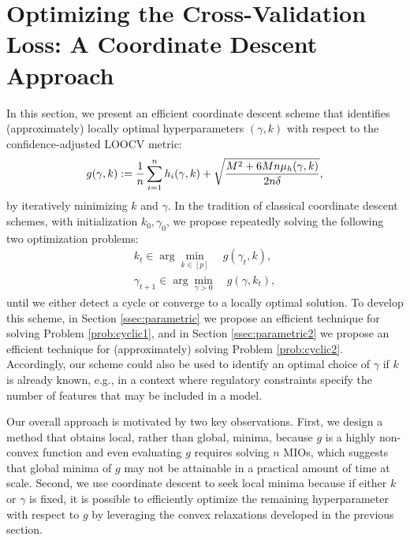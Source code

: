 \documentclass[opre,nonblindrev]{informs3} %
\begin{document}
\section{Optimizing the Cross-Validation Loss: A Coordinate Descent Approach}\label{sec:corddescent}
In this section, we present an efficient coordinate descent scheme that identifies (approximately) locally optimal hyperparameters $(\gamma, k)$ with respect to the confidence-adjusted LOOCV metric: 
\begin{equation}\label{prob:cyclic1}
	g(\gamma, k):= \frac{1}{n} \sum_{i=1}^n h_i(\gamma, k)+\sqrt{\frac{M^2+6 M n \mu_h(\gamma, k)}{2 n \delta}},\\[0.2em]
\end{equation}
by iteratively minimizing $k$ and $\gamma$. In the tradition of classical coordinate descent schemes, with initialization $k_0, \gamma_0$, we propose repeatedly solving the following two optimization problems:
\begin{align}\label{prob:cyclic2}
    k_t \in \arg\min_{k \in [p]} \quad g(\gamma_t, k),\\
    \gamma_{t+1} \in \arg \min_{\gamma >0 } \quad g(\gamma, k_t),
\end{align}
until we either detect a cycle or converge to a locally optimal solution. To develop this scheme, in Section \ref{ssec:parametric} we propose an efficient technique for solving Problem \eqref{prob:cyclic1}, %
and in Section \ref{ssec:parametric2} we propose an efficient technique for (approximately) solving Problem \eqref{prob:cyclic2}. Accordingly, our scheme could also be used to identify an optimal choice of $\gamma$ if $k$ is already known, e.g., in a context where regulatory constraints specify the number of features that may be included in a model.

Our overall approach is motivated by two key observations. First, we design a method that obtains local, rather than global, minima, because $g$ is a highly non-convex function and even evaluating $g$ requires solving $n$ MIOs, which suggests that global minima of $g$ may not be attainable in a practical amount of time at scale. Second, we use coordinate descent to seek local minima because if either $k$ or $\gamma$ is fixed, it is possible to efficiently optimize the remaining hyperparameter with respect to $g$ by leveraging the convex relaxations developed in the previous section. %
\end{document}
